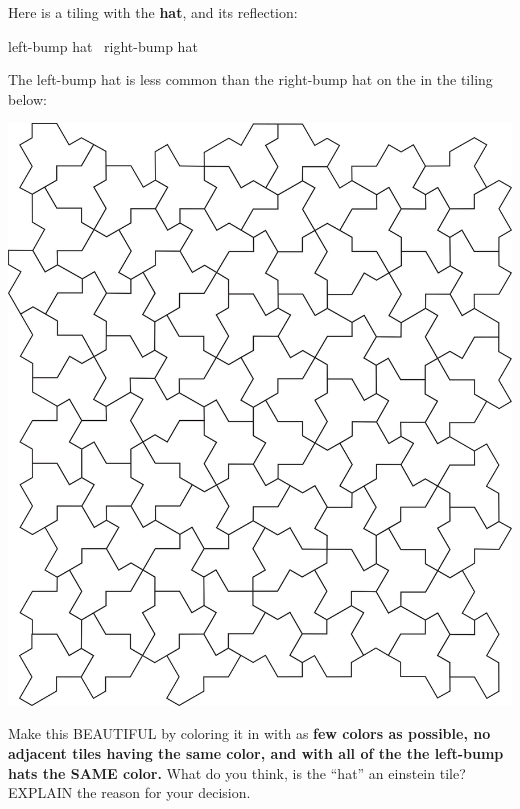 \documentclass[noauthor,nooutcomes,handout,hints,12pt]{ximera}
\begin{document}
\begin{question}
  Here is a tiling with the \textbf{hat}, and its reflection:
  \begin{center}
    left-bump hat~
    right-bump hat
  \end{center}
  The left-bump hat is less common than the right-bump hat on the in
  the tiling below:
  \begin{center}
    \includegraphics[scale=.8]{hat.png}
  \end{center}
  Make this BEAUTIFUL by coloring it in with as \textbf{few colors as
    possible, no adjacent tiles having the same color, and with
    all of the the left-bump hats the SAME color.} What do you
  think, is the ``hat'' an einstein tile? EXPLAIN the reason for your
  decision.
\end{question}
\end{document}
